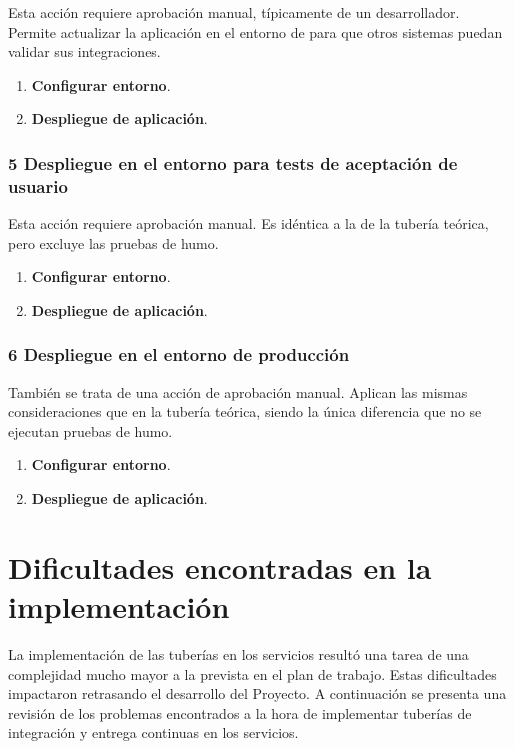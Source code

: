 Esta acción requiere aprobación manual, típicamente de un
desarrollador. Permite actualizar la aplicación en el entorno de
 para que otros sistemas puedan validar sus
integraciones.

\begin{enumerate}
\item \textbf{Configurar entorno}.
\item \textbf{Despliegue de aplicación}.
\end{enumerate}
\subsubsection{5 Despliegue en el entorno para tests de aceptación de usuario}

Esta acción requiere aprobación manual. Es idéntica a la de la tubería
teórica, pero excluye las pruebas de humo.

\begin{enumerate}
\item \textbf{Configurar entorno}.
\item \textbf{Despliegue de aplicación}.
\end{enumerate}
\subsubsection{6 Despliegue en el entorno de producción}

También se trata de una acción de aprobación manual. Aplican las
mismas consideraciones que en la tubería teórica, siendo la única
diferencia que no se ejecutan pruebas de humo.

\begin{enumerate}
\item \textbf{Configurar entorno}.
\item \textbf{Despliegue de aplicación}.
\end{enumerate}
\section{Dificultades encontradas en la implementación}

La implementación de las tuberías en los servicios resultó una tarea
de una complejidad mucho mayor a la prevista en el plan de
trabajo. Estas dificultades impactaron retrasando el desarrollo del
Proyecto. A continuación se presenta una revisión de los problemas
encontrados a la hora de implementar tuberías de integración y entrega
continuas en los servicios.

